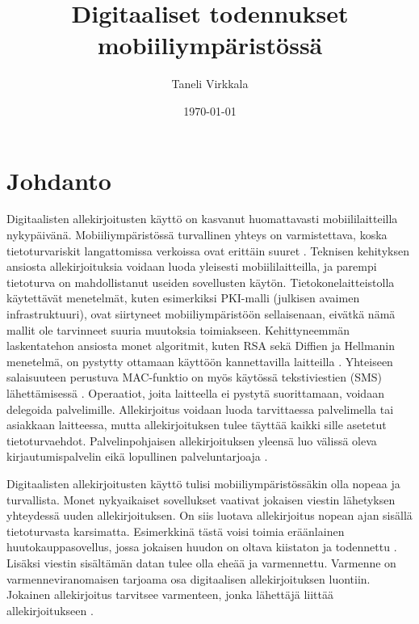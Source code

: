\documentclass[finnish]{tktltiki2}
\title{Digitaaliset todennukset mobiiliympäristössä}
\author{Taneli Virkkala}
\date{\today}
\theoremstyle{definition}
\theoremstyle{remark}
\begin{document}

\frontmatter      %

\maketitle        %
\makeabstract     %

\tableofcontents  %


\mainmatter       %

\section{Johdanto}



Digitaalisten allekirjoitusten käyttö on kasvanut huomattavasti mobiililaitteilla nykypäivänä. Mobiiliympäristössä turvallinen yhteys on varmistettava, koska tietoturvariskit langattomissa verkoissa ovat erittäin suuret \cite{enti}. Teknisen kehityksen ansiosta allekirjoituksia voidaan luoda yleisesti mobiililaitteilla, ja parempi tietoturva on mahdollistanut useiden sovellusten käytön. Tietokonelaitteistolla käytettävät menetelmät, kuten esimerkiksi PKI-malli (julkisen avaimen infrastruktuuri), ovat siirtyneet mobiiliympäristöön sellaisenaan, eivätkä nämä mallit ole tarvinneet suuria muutoksia toimiakseen. Kehittyneemmän laskentatehon ansiosta monet algoritmit, kuten RSA sekä Diffien ja Hellmanin menetelmä, on pystytty ottamaan käyttöön kannettavilla laitteilla \cite{enti}. Yhteiseen salaisuuteen perustuva MAC-funktio on myös käytössä tekstiviestien (SMS) lähettämisessä \cite{MAC}. Operaatiot, joita laitteella ei pystytä suorittamaan, voidaan delegoida palvelimille. Allekirjoitus voidaan luoda tarvittaessa palvelimella tai asiakkaan laitteessa, mutta allekirjoituksen tulee täyttää kaikki sille asetetut tietoturvaehdot. Palvelinpohjaisen allekirjoituksen yleensä luo välissä oleva kirjautumispalvelin eikä lopullinen palveluntarjoaja \cite{proxy}.

Digitaalisten allekirjoitusten käyttö tulisi mobiiliympäristössäkin  olla nopeaa ja turvallista. Monet nykyaikaiset sovellukset vaativat jokaisen viestin lähetyksen yhteydessä uuden allekirjoituksen. On siis luotava allekirjoitus nopean ajan sisällä tietoturvasta karsimatta. Esimerkkinä tästä voisi toimia eräänlainen huutokauppasovellus, jossa jokaisen huudon on oltava kiistaton ja todennettu \cite{proxy}. Lisäksi viestin sisältämän datan tulee olla eheää ja varmennettu. Varmenne on varmenneviranomaisen tarjoama osa digitaalisen allekirjoituksen luontiin. Jokainen allekirjoitus tarvitsee varmenteen, jonka lähettäjä liittää allekirjoitukseen \cite{ECC}.   
\end{document}

